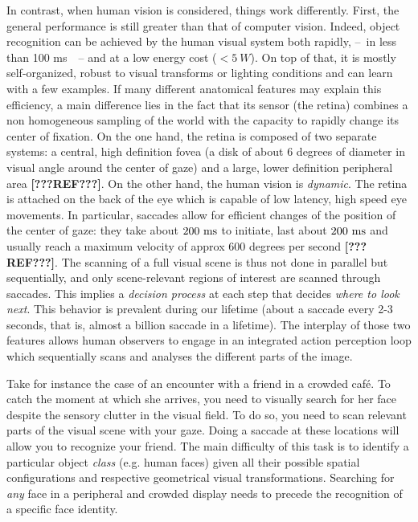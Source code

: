 In contrast, when human vision is considered, things work differently. First, the  general performance is still greater than that of computer vision.
Indeed, object recognition can be achieved by the human visual system both rapidly, --~in less than 100 ms~\cite{Kirchner06}~-- and at a low energy cost ($<5~W$).
On top of that, it is mostly self-organized, robust to visual transforms or lighting conditions and can learn with a few examples. If many different anatomical features may explain this efficiency, a main difference lies in the fact that its sensor (the retina) combines a non homogeneous sampling of the world with the capacity to rapidly change its center of fixation. On the one hand, the retina is composed of two separate systems: a central, high definition fovea (a disk of about 6 degrees of diameter in visual angle around the center of gaze) and a large, lower definition peripheral area {\color{red} \textbf{[???REF???]}}.
On the other hand, the human vision is \emph{dynamic}. The retina is attached on the back of the eye which is capable of low latency, high speed eye movements. In particular, saccades allow for efficient changes of the position of the center of gaze: they take about $200~\si{\milli\second}$ to initiate, last about $200~\si{\milli\second}$ and usually reach a maximum velocity of approx 600 degrees per second {\color{red} \textbf{[???REF???]}}. The scanning of a full visual scene is thus  not done in parallel but sequentially, and only scene-relevant regions of interest are scanned through saccades. This implies a \emph{decision process} at each step that decides \emph{where to look next}. This behavior is prevalent during our lifetime (about a saccade every 2-3 seconds, that is, almost a billion saccade in a lifetime). The interplay of those two features allows human observers to engage in an integrated action perception loop which sequentially scans and analyses the different parts of the image.


Take for instance the case of an encounter with a friend in a crowded café. To catch the moment at which she arrives, you need to visually search for her face despite the sensory clutter in the visual field. To do so, you need to scan relevant parts of the visual scene with your gaze. Doing a saccade at these locations will allow you to recognize your friend. The main difficulty of this task is to identify a particular object \emph{class} (e.g. human faces) given all their possible spatial configurations and respective geometrical visual transformations. Searching for \emph{any} face in a peripheral and crowded display needs to precede the recognition of a specific face identity.


